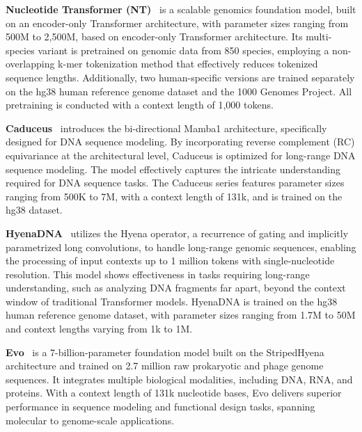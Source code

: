 \textbf{Nucleotide Transformer (NT)}~\citep{dalla2023nucleotide} is a scalable genomics foundation model, built on an encoder-only Transformer architecture, with parameter sizes ranging from 500M to 2,500M, based on encoder-only Transformer architecture. 
Its multi-species variant is pretrained on genomic data from 850 species, employing a non-overlapping k-mer tokenization method that effectively reduces tokenized sequence lengths. 
Additionally, two human-specific versions are trained separately on the hg38 human reference genome dataset and the 1000 Genomes Project. All pretraining is conducted with a context length of 1,000 tokens. 

\textbf{Caduceus}~\citep{schiff2023caduceus} introduces the bi-directional Mamba1 architecture, specifically designed for DNA sequence modeling. By incorporating reverse complement (RC) equivariance at the architectural level, Caduceus is optimized for long-range DNA sequence modeling. The model effectively captures the intricate understanding required for DNA sequence tasks. The Caduceus series features parameter sizes ranging from 500K to 7M, with a context length of 131k, and is trained on the hg38 dataset.

\textbf{HyenaDNA}~\citep{poli2023hyenadna} utilizes the Hyena operator, a recurrence of gating and implicitly parametrized long convolutions, to handle long-range genomic sequences, enabling the processing of input contexts up to 1 million tokens with single-nucleotide resolution. 
This model shows effectiveness in tasks requiring long-range understanding, such as analyzing DNA fragments far apart, beyond the context window of traditional Transformer models. HyenaDNA is trained on the hg38 human reference genome dataset, with parameter sizes ranging from 1.7M to 50M and context lengths varying from 1k to 1M.

\textbf{Evo}~\citep{meier2023evo} is a 7-billion-parameter foundation model built on the StripedHyena architecture and trained on 2.7 million raw prokaryotic and phage genome sequences. 
It integrates multiple biological modalities, including DNA, RNA, and proteins. With a context length of 131k nucleotide bases, Evo delivers superior performance in sequence modeling and functional design tasks, spanning molecular to genome-scale applications.

